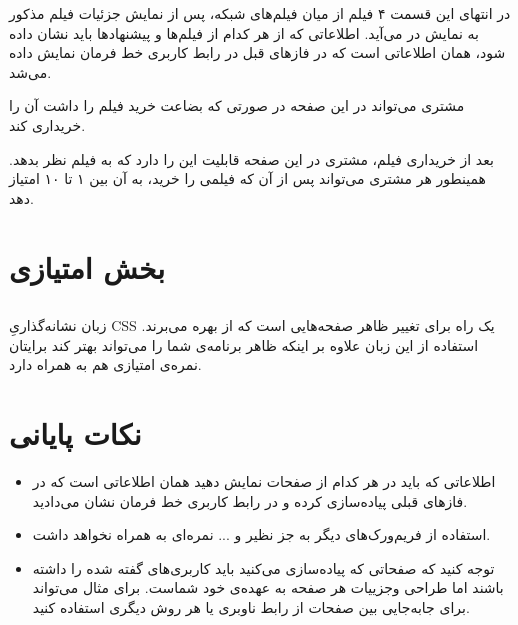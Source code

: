 \documentclass{utap}
\begin{document}
		در  انتهای این قسمت ۴ فیلم از میان فیلم‌های شبکه، پس از نمایش جزئیات فیلم مذکور به نمایش در می‌آید. 
		اطلاعاتی که از هر کدام از فیلم‌ها و پیشنهاد‌ها باید نشان داده شود، همان اطلاعاتی است که در فاز‌های قبل در رابط کاربری خط فرمان نمایش داده می‌شد.
		
		مشتری می‌تواند در این صفحه در صورتی که بضاعت خرید فیلم را داشت آن‌ را خریداری کند. 
		
		بعد از خریداری فیلم، مشتری در این صفحه قابلیت این را دارد که به فیلم نظر بدهد. همینطور هر مشتری می‌تواند پس از آن‌ که فیلمی را خرید، به آن بین ۱ تا ۱۰ امتیاز دهد. 
	
	
	
	
	
	
	
	
	\section{بخش امتیازی}
		\subsection{}
	زبان نشانه‌گذاریِ 
CSS
 یک راه برای تغییر ظاهر صفحه‌هایی است که از  بهره می‌برند. استفاده از این زبان علاوه بر اینکه ظاهر برنامه‌ی شما را می‌تواند بهتر کند برایتان نمره‌ی امتیازی هم به همراه دارد.
 
 
 
 
	\section{نکات پایانی}
		\begin{itemize}
			\item  اطلاعاتی که باید در هر کدام از صفحات نمایش دهید همان اطلاعاتی است که در فاز‌های قبلی پیاده‌سازی کرده‌ و در رابط کاربری خط فرمان نشان می‌دادید. 
			\item  
			استفاده از فریم‌ورک‌های دیگر به جز
				نظیر 
				و ... نمره‌ای به همراه نخواهد داشت.
				
			\item 
			توجه کنید که صفحاتی که پیادەسازی می‌کنید باید کاربری‌های گفته شده را داشته باشند اما طراحی وجزییات هر صفحه به عهدەی خود شماست. برای مثال می‌تواند برای جابه‌جایی بین صفحات از رابط ناوبری
			یا هر روش دیگری استفاده کنید. 
		\end{itemize}
\end{document}

